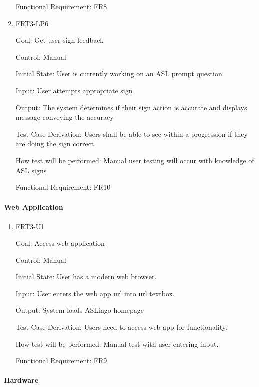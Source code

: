 \documentclass[12pt, titlepage]{article}
\begin{document}
\begin{enumerate}
Functional Requirement: FR8

\item{FRT3-LP6}

Goal: Get user sign feedback

Control: Manual
					
Initial State: User is currently working on an ASL prompt question

Input: User attempts appropriate sign
					
Output: The system determines if their sign action is accurate and displays message conveying the accuracy

Test Case Derivation: Users shall be able to see within a progression if they are doing the sign correct
					
How test will be performed: Manual user testing will occur with knowledge of ASL signs

Functional Requirement: FR10

\end{enumerate}

\paragraph{Web Application}

\begin{enumerate}

\item{FRT3-U1}

Goal: Access web application

Control: Manual
					
Initial State: User has a modern web browser.
					
Input: User enters the web app url into url textbox.
					
Output: System loads ASLingo homepage

Test Case Derivation: Users need to access web app for functionality.
					
How test will be performed: Manual test with user entering input.

Functional Requirement: FR9

\end{enumerate}

\paragraph{Hardware}
\end{document}
